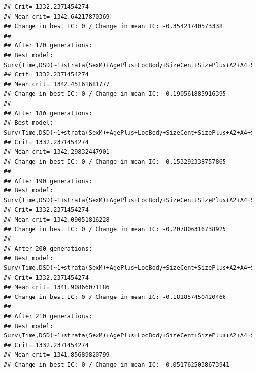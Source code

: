 \documentclass{article}\usepackage[]{graphicx}\usepackage[]{color}
\makeatletter
\newenvironment{kframe}{%
 \def\at@end@of@kframe{}%
 \ifinner\ifhmode%
  \def\at@end@of@kframe{\end{minipage}}%
  \begin{minipage}{\columnwidth}%
 \fi\fi%
 \def\FrameCommand##1{\hskip\@totalleftmargin \hskip-\fboxsep
 \colorbox{shadecolor}{##1}\hskip-\fboxsep
     \hskip-\linewidth \hskip-\@totalleftmargin \hskip\columnwidth}%
 \MakeFramed {\advance\hsize-\width
   \@totalleftmargin\z@ \linewidth\hsize
   \@setminipage}}%
 {\par\unskip\endMakeFramed%
 \at@end@of@kframe}
\newenvironment{knitrout}{}{} %
\makeatother
\begin{document}
\begin{knitrout}
\begin{kframe}
\begin{verbatim}
## Crit= 1332.2371454274
## Mean crit= 1342.64217870369
## Change in best IC: 0 / Change in mean IC: -0.35421740573338
## 
## After 170 generations:
## Best model: Surv(Time,DSD)~1+strata(SexM)+AgePlus+LocBody+SizeCent+SizePlus+A2+A4+SizeCent:LocBody+A2:SizeCent+strata(SexM):AgePlus+strata(SexM):SizePlus
## Crit= 1332.2371454274
## Mean crit= 1342.45161681777
## Change in best IC: 0 / Change in mean IC: -0.190561885916395
## 
## After 180 generations:
## Best model: Surv(Time,DSD)~1+strata(SexM)+AgePlus+LocBody+SizeCent+SizePlus+A2+A4+SizeCent:LocBody+A2:SizeCent+strata(SexM):AgePlus+strata(SexM):SizePlus
## Crit= 1332.2371454274
## Mean crit= 1342.29832447901
## Change in best IC: 0 / Change in mean IC: -0.153292338757865
## 
## After 190 generations:
## Best model: Surv(Time,DSD)~1+strata(SexM)+AgePlus+LocBody+SizeCent+SizePlus+A2+A4+SizeCent:LocBody+A2:SizeCent+strata(SexM):AgePlus+strata(SexM):SizePlus
## Crit= 1332.2371454274
## Mean crit= 1342.09051816228
## Change in best IC: 0 / Change in mean IC: -0.207806316738925
## 
## After 200 generations:
## Best model: Surv(Time,DSD)~1+strata(SexM)+AgePlus+LocBody+SizeCent+SizePlus+A2+A4+SizeCent:LocBody+A2:SizeCent+strata(SexM):AgePlus+strata(SexM):SizePlus
## Crit= 1332.2371454274
## Mean crit= 1341.90866071186
## Change in best IC: 0 / Change in mean IC: -0.181857450420466
## 
## After 210 generations:
## Best model: Surv(Time,DSD)~1+strata(SexM)+AgePlus+LocBody+SizeCent+SizePlus+A2+A4+SizeCent:LocBody+A2:SizeCent+strata(SexM):AgePlus+strata(SexM):SizePlus
## Crit= 1332.2371454274
## Mean crit= 1341.85689820799
## Change in best IC: 0 / Change in mean IC: -0.0517625038673941
\end{verbatim}



\end{kframe}
\end{knitrout}
\end{document}
